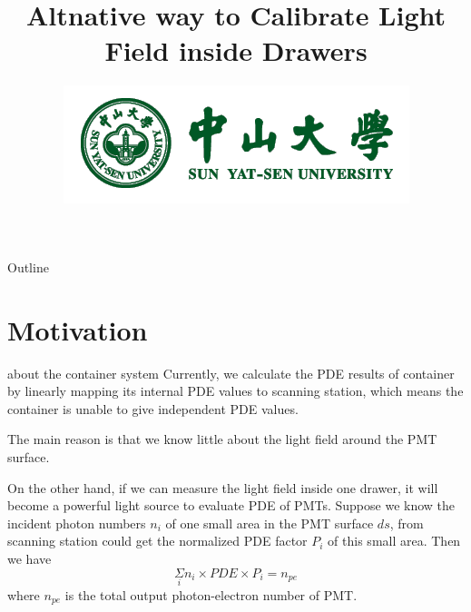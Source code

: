 \documentclass[11pt,compress,xcolor=x11names,UTF8]{beamer}
\title{ Altnative way to Calibrate Light Field inside Drawers }
\author[Rong. Zhao]{Email：zhaor25@mail2.sysu.edu.cn \and  } %
\institute[SYSU]{School of Physics\and } %
\date[\today]{\includegraphics[width=.5\textwidth]{logo}}
\begin{document}
\maketitle

\begin{frame}{Outline}
\tableofcontents
\end{frame}

\section{Motivation}


\begin{frame}{about the container system}
Currently, we calculate the PDE results of container by linearly mapping its internal PDE values to scanning station, which means the container is unable to give independent PDE values. 

\vspace{.5cm}

\alert{The main reason is that we know little about the light field around the PMT surface.} 

\vspace{.5cm}

On the other hand, if we can measure the light field inside one drawer, it will become a powerful light source to evaluate PDE of PMTs. Suppose we know the incident photon numbers $n_i$ of one small area in the PMT surface $ds$, from scanning station could get the normalized PDE factor $P_i$ of this small area. Then we have   
\begin{equation}
\Sigma\limits_{i} n_i\times PDE\times P_i=n_{pe}
\label{eq:01}
\end{equation}
where $n_{pe}$ is the total output photon-electron number of PMT.
\end{frame}
\end{document}
